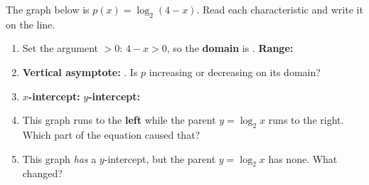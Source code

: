 \documentclass[10pt]{article}
\newcommand{\lgrid}[4]{%
  \draw[step=1, linegray!40, very thin] (#1,#3) grid (#2,#4);
  \draw[->, semithick, charcoal] (#1,0)--(#2,0) node[below right, font=\scriptsize]{$x$};
  \draw[->, semithick, charcoal] (0,#3)--(0,#4) node[left, font=\scriptsize]{$y$};}
\begin{document}
\begin{practicebox}
The graph below is $p(x) = \log_2(4-x)$. Read each characteristic and write it on the line.
\begin{center}
\end{center}
\begin{enumerate}[leftmargin=1.7em, itemsep=3pt]
  \item Set the argument $>0$: $4-x>0$, so the \textbf{domain} is \blank{3.4cm}. \quad
        \textbf{Range:} \blank{3.0cm}
  \item \textbf{Vertical asymptote:} \blank{1.6cm}. \quad Is $p$ increasing or decreasing on its
        domain? \blank{2.4cm}
  \item \textbf{$x$-intercept:} \blank{1.6cm} \quad \textbf{$y$-intercept:} \blank{1.6cm}
  \item This graph runs to the \textbf{left} while the parent $y=\log_2 x$ runs to the right. Which
        part of the equation caused that? \blank{5.0cm}
  \item This graph \emph{has} a $y$-intercept, but the parent $y=\log_2 x$ has none. What changed?
        \blank{5.0cm}
\end{enumerate}
\end{practicebox}
\end{document}
